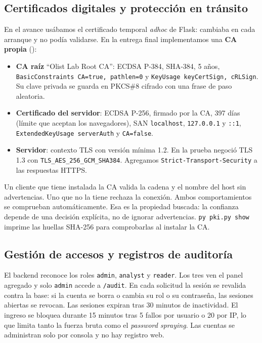 \documentclass[12pt,a4paper]{article}
\begin{document}
\subsection{Certificados digitales y protección en tránsito}
\label{sec:certificados}
En el avance usábamos el certificado temporal \emph{adhoc} de Flask: cambiaba en cada arranque y no podía validarse. En la entrega final implementamos una \textbf{CA propia} ():
\begin{itemize}
\item \textbf{CA raíz} ``Olist Lab Root CA'': ECDSA P-384, SHA-384, 5 años, \texttt{BasicConstraints CA=true, pathlen=0} y \texttt{KeyUsage keyCertSign, cRLSign}. Su clave privada se guarda en PKCS\#8 cifrado con una frase de paso aleatoria.
\item \textbf{Certificado del servidor}: ECDSA P-256, firmado por la CA, 397 días (límite que aceptan los navegadores), SAN \texttt{localhost}, \texttt{127.0.0.1} y \texttt{::1}, \texttt{ExtendedKeyUsage serverAuth} y \texttt{CA=false}.
\item \textbf{Servidor}: contexto TLS con versión mínima 1.2. En la prueba negoció TLS 1.3 con \texttt{TLS\_AES\_256\_GCM\_SHA384}. Agregamos \texttt{Strict-Transport-Security} a las respuestas HTTPS.
\end{itemize}
Un cliente que tiene instalada la CA valida la cadena y el nombre del host sin advertencias. Uno que no la tiene rechaza la conexión. Ambos comportamientos se comprueban automáticamente. Esa es la propiedad buscada: la confianza depende de una decisión explícita, no de ignorar advertencias. \texttt{py pki.py show} imprime las huellas SHA-256 para comprobarlas al instalar la CA.

\subsection{Gestión de accesos y registros de auditoría}
El backend reconoce los roles \texttt{admin}, \texttt{analyst} y \texttt{reader}. Los tres ven el panel agregado y solo \texttt{admin} accede a \texttt{/audit}. En cada solicitud la sesión se revalida contra la base: si la cuenta se borra o cambia su rol o su contraseña, las sesiones abiertas se revocan. Las sesiones expiran tras 30 minutos de inactividad. El ingreso se bloquea durante 15 minutos tras 5 fallos por usuario o 20 por IP, lo que limita tanto la fuerza bruta como el \emph{password spraying}. Las cuentas se administran solo por consola y no hay registro web.
\end{document}
